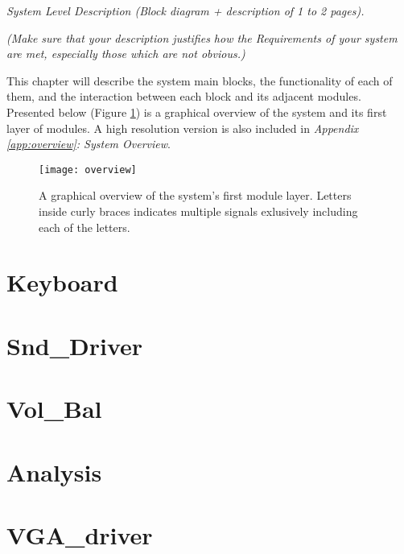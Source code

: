 \emph{System Level Description (Block diagram + description of 1 to 2 pages).}

\emph{(Make sure that your description justifies how the Requirements of your system are met, especially those which are not obvious.)}


This chapter will describe the system main blocks, the functionality of each of them, and the interaction between each block and its adjacent modules. Presented below (Figure \ref{fig:overview}) is a graphical overview of the system and its first layer of modules. A high resolution version is also included in \emph{Appendix \ref{app:overview}: System Overview}.

\begin{figure}[H]
  \centering
  \texttt{[image: overview]}
  \caption{A graphical overview of the system's first module layer. Letters inside curly braces indicates multiple signals exlusively including each of the letters.}
  \label{fig:overview}
\end{figure}

\section{Keyboard}\label{sec:keyboard}


\section{Snd\_Driver}\label{sec:snddriver}


\section{Vol\_Bal}\label{sec:volbal}


\section{Analysis}\label{sec:analysis}


\section{VGA\_driver}\label{sec:vgadriver}


